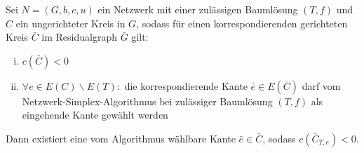 \begin{lem}\label{iterierbar}Sei $N=(G,b,c,u)$ ein Netzwerk mit einer zulässigen Baumlösung $(T,f)$ und $C$ ein ungerichteter Kreis in $G$, sodass für einen korrespondierenden gerichteten Kreis $\bar{C}$ im Residualgraph $\bar{G}$ gilt:
\begin{enumerate}[(i)]
	\item $c(\bar{C})<0$\label{negativ}
	\item $\forall e\in E(C)\backslash E(T) \colon$ die korrespondierende Kante $\bar{e}\in E(\bar{C})$ darf vom Netzwerk-Simplex-Algorithmus bei zulässiger Baumlösung $(T,f)$ als eingehende Kante gewählt werden\label{wählbar}
\end{enumerate}
Dann existiert eine vom Algorithmus wählbare Kante $\bar{e}\in\bar{C}$, sodass $c(\bar{C}_{T,\bar{e}})<0$.
\end{lem}
